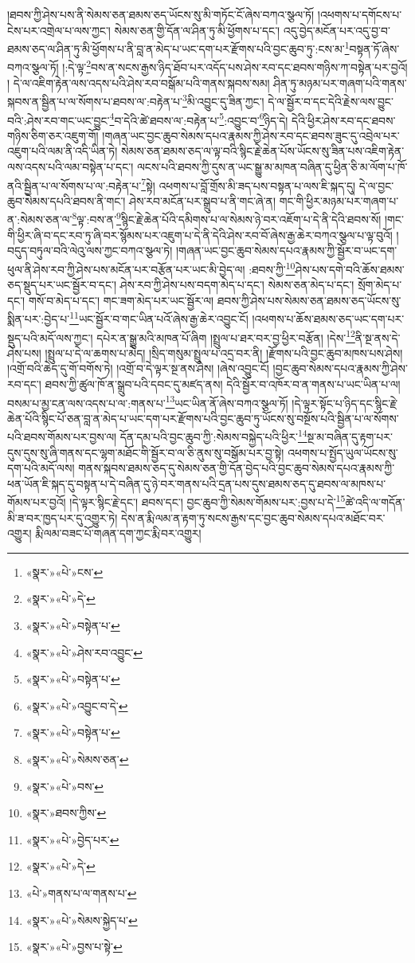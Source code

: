 །ཐབས་ཀྱི་ཤེས་པས་ནི་སེམས་ཅན་ཐམས་ཅད་ཡོངས་སུ་མི་གཏོང་ངོ་ཞེས་བཀའ་སྩལ་ཏོ། །འཕགས་པ་དགོངས་པ་ངེས་པར་འགྲེལ་པ་ལས་ཀྱང་། སེམས་ཅན་གྱི་དོན་ལ་ཤིན་ཏུ་མི་ཕྱོགས་པ་དང་། འདུ་བྱེད་མངོན་པར་འདུ་བྱ་བ་ཐམས་ཅད་ལ་ཤིན་ཏུ་མི་ཕྱོགས་པ་ནི་བླ་ན་མེད་པ་ཡང་དག་པར་རྫོགས་པའི་བྱང་ཆུབ་ཏུ་:ངས་མ་\footnote{«སྣར་»«པེ་»ངས་}བསྟན་ཏོ་ཞེས་བཀའ་སྩལ་ཏོ། །:དེ་ལྟ་\footnote{«སྣར་»«པེ་»དེ་}བས་ན་སངས་རྒྱས་ཉིད་ཐོབ་པར་འདོད་པས་ཤེས་རབ་དང་ཐབས་གཉིས་ཀ་བསྟེན་པར་བྱའོ། །
དེ་ལ་འཇིག་རྟེན་ལས་འདས་པའི་ཤེས་རབ་བསྒོམ་པའི་གནས་སྐབས་སམ། ཤིན་ཏུ་མཉམ་པར་གཞག་པའི་གནས་སྐབས་ན་སྦྱིན་པ་ལ་སོགས་པ་ཐབས་ལ་:བརྟེན་པ་\footnote{«སྣར་»«པེ་»བསྟེན་པ་}མི་འབྱུང་དུ་ཟིན་ཀྱང་། དེ་ལ་སྦྱོར་བ་དང་དེའི་རྗེས་ལས་བྱུང་བའི་:ཤེས་རབ་གང་ཡང་བྱུང་\footnote{«སྣར་»«པེ་»ཤེས་རབ་འབྱུང་}བ་དེའི་ཚེ་ཐབས་ལ་:བརྟེན་པ་\footnote{«སྣར་»«པེ་»བསྟེན་པ་}:འབྱུང་བ་\footnote{«སྣར་»«པེ་»འབྱུང་བ་དེ་}ཉིད་དེ། དེའི་ཕྱིར་ཤེས་རབ་དང་ཐབས་གཉིས་ཅིག་ཅར་འཇུག་གོ། །གཞན་ཡང་བྱང་ཆུབ་སེམས་དཔའ་རྣམས་ཀྱི་ཤེས་རབ་དང་ཐབས་ཟུང་དུ་འབྲེལ་པར་འཇུག་པའི་ལམ་ནི་འདི་ཡིན་ཏེ། སེམས་ཅན་ཐམས་ཅད་ལ་ལྟ་བའི་སྙིང་རྗེ་ཆེན་པོས་ཡོངས་སུ་ཟིན་པས་འཇིག་རྟེན་ལས་འདས་པའི་ལམ་བསྟེན་པ་དང་། ལངས་པའི་ཐབས་ཀྱི་དུས་ན་ཡང་སྒྱུ་མ་མཁན་བཞིན་དུ་ཕྱིན་ཅི་མ་ལོག་པ་ཁོ་ནའི་སྦྱིན་པ་ལ་སོགས་པ་ལ་:བརྟེན་པ་\footnote{«སྣར་»«པེ་»བསྟེན་པ་}སྟེ། འཕགས་པ་བློ་གྲོས་མི་ཟད་པས་བསྟན་པ་ལས་ཇི་སྐད་དུ། དེ་ལ་བྱང་ཆུབ་སེམས་དཔའི་ཐབས་ནི་གང་། ཤེས་རབ་མངོན་པར་སྒྲུབ་པ་ནི་གང་ཞེ་ན། གང་གི་ཕྱིར་མཉམ་པར་གཞག་པ་ན་:སེམས་ཅན་ལ་\footnote{«སྣར་»«པེ་»སེམས་ཅན་}ལྟ་:བས་ན་\footnote{«སྣར་»«པེ་»བས་}སྙིང་རྗེ་ཆེན་པོའི་དམིགས་པ་ལ་སེམས་ཉེ་བར་འཇོག་པ་དེ་ནི་དེའི་ཐབས་སོ། །གང་གི་ཕྱིར་ཞི་བ་དང་རབ་ཏུ་ཞི་བར་སྙོམས་པར་འཇུག་པ་དེ་ནི་དེའི་ཤེས་རབ་བོ་ཞེས་རྒྱ་ཆེར་བཀའ་སྩལ་པ་ལྟ་བུའོ། །བདུད་བཏུལ་བའི་ལེའུ་ལས་ཀྱང་བཀའ་སྩལ་ཏེ། །གཞན་ཡང་བྱང་ཆུབ་སེམས་དཔའ་རྣམས་ཀྱི་སྦྱོར་བ་ཡང་དག་ཕུལ་ནི་ཤེས་རབ་ཀྱི་ཤེས་པས་མངོན་པར་བརྩོན་པར་ཡང་མི་བྱེད་ལ། :ཐབས་ཀྱི་\footnote{«སྣར་»ཐབས་ཀྱིས་}ཤེས་པས་དགེ་བའི་ཆོས་ཐམས་ཅད་སྡུད་པར་ཡང་སྦྱོར་བ་དང་། ཤེས་རབ་ཀྱི་ཤེས་པས་བདག་མེད་པ་དང་། སེམས་ཅན་མེད་པ་དང་། སྲོག་མེད་པ་དང་། གསོ་བ་མེད་པ་དང་། གང་ཟག་མེད་པར་ཡང་སྦྱོར་ལ། ཐབས་ཀྱི་ཤེས་པས་སེམས་ཅན་ཐམས་ཅད་ཡོངས་སུ་སྨིན་པར་:བྱེད་པ་\footnote{«སྣར་»«པེ་»བྱེད་པར་}ཡང་སྦྱོར་བ་གང་ཡིན་པའོ་ཞེས་རྒྱ་ཆེར་འབྱུང་ངོ། །འཕགས་པ་ཆོས་ཐམས་ཅད་ཡང་དག་པར་སྡུད་པའི་མདོ་ལས་ཀྱང་། དཔེར་ན་སྒྱུ་མའི་མཁན་པོ་ཞིག །སྤྲུལ་པ་ཐར་བར་བྱ་ཕྱིར་བརྩོན། །དེས་\footnote{«སྣར་»«པེ་»དེ་}ནི་སྔ་ནས་དེ་ཤེས་པས། །སྤྲུལ་པ་དེ་ལ་ཆགས་པ་མེད། །སྲིད་གསུམ་སྤྲུལ་པ་འདྲ་བར་ནི། །རྫོགས་པའི་བྱང་ཆུབ་མཁས་པས་ཤེས། །འགྲོ་བའི་ཆེད་དུ་གོ་བགོས་ཏེ། །འགྲོ་བ་དེ་ལྟར་སྔ་ནས་ཤེས། །ཞེས་འབྱུང་ངོ། །བྱང་ཆུབ་སེམས་དཔའ་རྣམས་ཀྱི་ཤེས་རབ་དང་། ཐབས་ཀྱི་ཚུལ་ཁོ་ན་སྒྲུབ་པའི་དབང་དུ་མཛད་ནས། དེའི་སྦྱོར་བ་འཁོར་བ་ན་གནས་པ་ཡང་ཡིན་པ་ལ། བསམ་པ་མྱ་ངན་ལས་འདས་པ་ལ་:གནས་པ་\footnote{«པེ་»གནས་པ་ལ་གནས་པ་}ཡང་ཡིན་ནོ་ཞེས་བཀའ་སྩལ་ཏོ། །དེ་ལྟར་སྟོང་པ་ཉིད་དང་སྙིང་རྗེ་ཆེན་པོའི་སྙིང་པོ་ཅན་བླ་ན་མེད་པ་ཡང་དག་པར་རྫོགས་པའི་བྱང་ཆུབ་ཏུ་ཡོངས་སུ་བསྔོས་པའི་སྦྱིན་པ་ལ་སོགས་པའི་ཐབས་གོམས་པར་བྱས་ལ། དོན་དམ་པའི་བྱང་ཆུབ་ཀྱི་:སེམས་བསྐྱེད་པའི་ཕྱིར་\footnote{«སྣར་»«པེ་»སེམས་སྐྱེད་པ་}སྔ་མ་བཞིན་དུ་རྟག་པར་དུས་དུས་སུ་ཞི་གནས་དང་ལྷག་མཐོང་གི་སྦྱོར་བ་ལ་ཅི་ནུས་སུ་བསྒོམ་པར་བྱ་སྟེ། འཕགས་པ་སྤྱོད་ཡུལ་ཡོངས་སུ་དག་པའི་མདོ་ལས། གནས་སྐབས་ཐམས་ཅད་དུ་སེམས་ཅན་གྱི་དོན་བྱེད་པའི་བྱང་ཆུབ་སེམས་དཔའ་རྣམས་ཀྱི་ཕན་ཡོན་ཇི་སྐད་དུ་བསྟན་པ་དེ་བཞིན་དུ་ཉེ་བར་གནས་པའི་དྲན་པས་དུས་ཐམས་ཅད་དུ་ཐབས་ལ་མཁས་པ་གོམས་པར་བྱའོ། །དེ་ལྟར་སྙིང་རྗེ་དང་། ཐབས་དང་། བྱང་ཆུབ་ཀྱི་སེམས་གོམས་པར་:བྱས་པ་དེ་\footnote{«སྣར་»«པེ་»བྱས་པ་སྟེ་}ཚེ་འདི་ལ་གདོན་མི་ཟ་བར་ཁྱད་པར་དུ་འགྱུར་ཏེ། དེས་ན་རྨི་ལམ་ན་རྟག་ཏུ་སངས་རྒྱས་དང་བྱང་ཆུབ་སེམས་དཔའ་མཐོང་བར་འགྱུར། རྨི་ལམ་བཟང་པོ་གཞན་དག་ཀྱང་རྨི་བར་འགྱུར། 